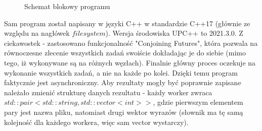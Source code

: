 \documentclass[a4paper,12pt]{article}
\begin{document}
\begin{justify}
\pagebreak

\begin{figure}[h!]
\centering
{}
    \caption{Schemat blokowy programu}
\end{figure}

\pagebreak

Sam program został napisany w języki C++ w standardzie C++17 (głównie ze względu na nagłówek $filesystem$). Wersja środowiska UPC++ to 2021.3.0. Z ciekawostek - zastosowano funkcjonalność "Conjoining Futures", która pozwala na równoczesne zlecenie wszystkich zadań swoiście dokładając je do siebie (mimo tego, iż wykonywane są na różnych węzłach). Finalnie główny proces oczekuje na wykonanie wszystkich zadań, a nie na każde po kolei. Dzięki temu program faktycznie jest asynchroniczny. Aby rezultaty mogły być poprawnie zapisane należało zmienić strukturę danych rezultatu - każdy worker zwraca $std::pair<std::string, std::vector<int>>$, gdzie pierwszym elementem pary jest nazwa pliku, natomiast drugi wektor wyrazów (słownik ma tę samą kolejność dla każdego workera, więc sam vector wystarczy).


\end{justify}
\end{document}
